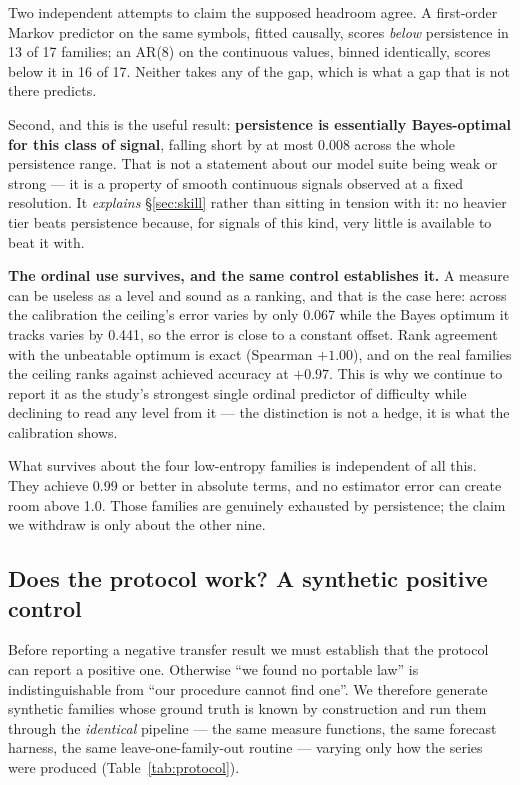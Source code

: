\documentclass[11pt,a4paper]{article}
\newcommand{\num}[1]{#1}
\begin{document}
Two independent attempts to claim the supposed headroom agree. A first-order
Markov predictor on the same symbols, fitted causally, scores \emph{below}
persistence in \num{13} of \num{17} families; an AR(8) on the continuous values,
binned identically, scores below it in \num{16} of \num{17}. Neither takes any
of the gap, which is what a gap that is not there predicts.

Second, and this is the useful result: \textbf{persistence is essentially
Bayes-optimal for this class of signal}, falling short by at most \num{0.008}
across the whole persistence range. That is not a statement about our model
suite being weak or strong --- it is a property of smooth continuous signals
observed at a fixed resolution. It \emph{explains} \S\ref{sec:skill} rather than
sitting in tension with it: no heavier tier beats persistence because, for
signals of this kind, very little is available to beat it with.

\textbf{The ordinal use survives, and the same control establishes it.} A
measure can be useless as a level and sound as a ranking, and that is the case
here: across the calibration the ceiling's error varies by only \num{0.067}
while the Bayes optimum it tracks varies by \num{0.441}, so the error is close
to a constant offset. Rank agreement with the unbeatable optimum is exact
(Spearman \(+1.00\)), and on the real families the ceiling ranks against
achieved accuracy at \(+0.97\). This is why we continue to report it as the
study's strongest single ordinal predictor of difficulty while declining to
read any level from it --- the distinction is not a hedge, it is what the
calibration shows.

What survives about the four low-entropy families is independent of all this.
They achieve \num{0.99} or better in absolute terms, and no estimator error can
create room above \num{1.0}. Those families are genuinely exhausted by
persistence; the claim we withdraw is only about the other nine.

\subsection{Does the protocol work? A synthetic positive control}
\label{sec:protocol}

Before reporting a negative transfer result we must establish that the protocol
can report a positive one. Otherwise ``we found no portable law'' is
indistinguishable from ``our procedure cannot find one''. We therefore generate
synthetic families whose ground truth is known by construction and run them
through the \emph{identical} pipeline --- the same measure functions, the same
forecast harness, the same leave-one-family-out routine --- varying only how the
series were produced (Table~\ref{tab:protocol}).
\end{document}
